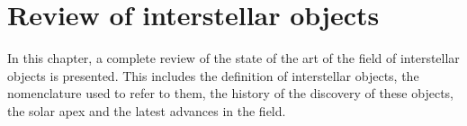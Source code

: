 \chapter{Review of interstellar objects}

In this chapter, a complete review of the state of the art of the field of
interstellar objects is presented. This includes the definition of interstellar
objects, the nomenclature used to refer to them, the history of the discovery of
these objects, the solar apex and the latest advances in the field.


%
%
%
%
